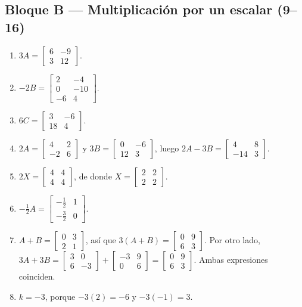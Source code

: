 \documentclass[12pt, letterpaper]{article}
\newcommand{\mwmat}[1]{\ensuremath{\begin{bmatrix}#1\end{bmatrix}}}
\begin{document}
\subsection*{Bloque B — Multiplicación por un escalar (9--16)}
\begin{enumerate}[label=\textbf{\arabic*.}, start=9, leftmargin=*]
  \item $3A=\mwmat{6&-9\\3&12}$.
  \item $-2B=\mwmat{2&-4\\0&-10\\-6&4}$.
  \item $6C=\mwmat{3&-6\\18&4}$.
  \item $2A=\mwmat{4&2\\-2&6}$ y $3B=\mwmat{0&-6\\12&3}$, luego
        $2A-3B=\mwmat{4&8\\-14&3}$.
  \item $2X=\mwmat{4&4\\4&4}$, de donde
        $X=\mwmat{2&2\\2&2}$.
  \item $-\tfrac12A=\mwmat{-\tfrac12&1\\[2pt]-\tfrac32&0}$.
  \item $A+B=\mwmat{0&3\\2&1}$, así que
        $3(A+B)=\mwmat{0&9\\6&3}$. Por otro lado,
        $3A+3B=\mwmat{3&0\\6&-3}+\mwmat{-3&9\\0&6}=\mwmat{0&9\\6&3}$.
        Ambas expresiones coinciden.
  \item $k=-3$, porque $-3(2)=-6$ y $-3(-1)=3$.
\end{enumerate}
\end{document}
